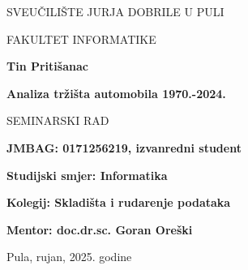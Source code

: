 \begin{center}
SVEUČILIŠTE JURJA DOBRILE U PULI 

FAKULTET INFORMATIKE

\vspace{45mm} 

\textbf{Tin Pritišanac}

\vspace{20mm} 

    \textbf{Analiza tržišta automobila 1970.-2024.}

\vspace{5mm}
SEMINARSKI RAD

\end{center}

\vspace{45mm}

\textbf{JMBAG: 0171256219, izvanredni student}

\textbf{Studijski smjer: Informatika}

\textbf{Kolegij: \textbf{Skladišta i rudarenje podataka} }

\textbf{Mentor: doc.dr.sc. Goran Oreški}

\vfill

\begin{center}

Pula, rujan, 2025. godine

\end{center}